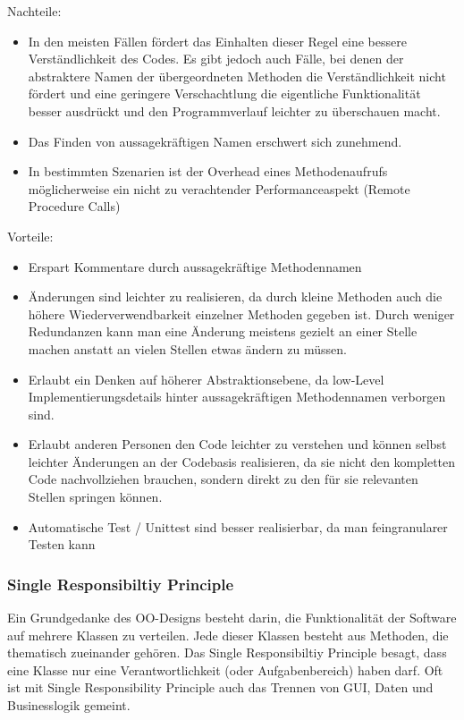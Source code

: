 \bigskip
Nachteile:
\begin{itemize}
\item In den meisten Fällen fördert das Einhalten dieser Regel eine bessere Verständlichkeit
des Codes. Es gibt jedoch auch Fälle, bei denen der abstraktere Namen der übergeordneten Methoden die Verständlichkeit nicht
fördert und eine geringere Verschachtlung die eigentliche Funktionalität besser
ausdrückt und den Programmverlauf leichter zu überschauen macht.
\item Das Finden von aussagekräftigen Namen erschwert sich zunehmend.
\item In bestimmten Szenarien ist der Overhead eines Methodenaufrufs möglicherweise
ein nicht zu verachtender Performanceaspekt (Remote Procedure Calls)
\end{itemize}
\bigskip
Vorteile:
\begin{itemize}
\item Erspart Kommentare durch aussagekräftige Methodennamen
\item Änderungen sind leichter zu realisieren, da durch kleine Methoden auch die
höhere Wiederverwendbarkeit einzelner Methoden gegeben ist. Durch weniger Redundanzen kann man
eine Änderung meistens gezielt an einer Stelle machen anstatt an vielen
Stellen etwas ändern zu müssen.
\item Erlaubt ein Denken auf höherer Abstraktionsebene, da low-Level
Implementierungsdetails hinter aussagekräftigen Methodennamen verborgen sind.
\item Erlaubt anderen Personen den Code leichter zu verstehen und  können selbst
leichter Änderungen an der Codebasis realisieren, da sie nicht den kompletten
Code nachvollziehen brauchen, sondern direkt zu den für sie relevanten Stellen
springen können.
\item Automatische Test / Unittest sind besser realisierbar, da man feingranularer
Testen kann
\end{itemize}

\subsubsection{Single Responsibiltiy Principle}

Ein Grundgedanke des OO-Designs besteht darin, die Funktionalität der Software auf mehrere
Klassen zu verteilen. Jede dieser Klassen besteht aus Methoden, die thematisch zueinander gehören. 
Das Single Responsibiltiy Principle besagt, dass eine Klasse nur eine
Verantwortlichkeit (oder Aufgabenbereich) haben darf.
Oft ist mit Single Responsibility Principle auch das Trennen von
GUI, Daten und Businesslogik gemeint.


